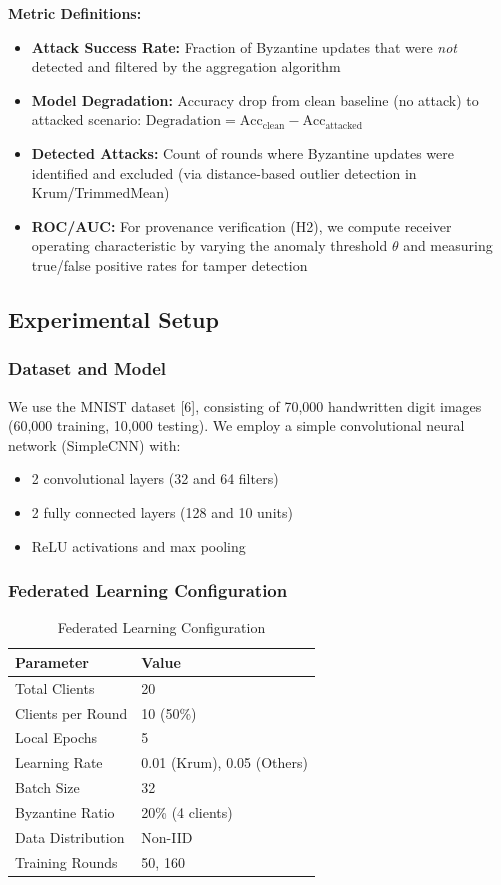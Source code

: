 \documentclass[12pt,a4paper,onecolumn]{article}
\begin{document}
\textbf{Metric Definitions:}
\begin{itemize}
    \item \textbf{Attack Success Rate:} Fraction of Byzantine updates that were \emph{not} detected and filtered by the aggregation algorithm
    \item \textbf{Model Degradation:} Accuracy drop from clean baseline (no attack) to attacked scenario: $\text{Degradation} = \text{Acc}_{\text{clean}} - \text{Acc}_{\text{attacked}}$
    \item \textbf{Detected Attacks:} Count of rounds where Byzantine updates were identified and excluded (via distance-based outlier detection in Krum/TrimmedMean)
    \item \textbf{ROC/AUC:} For provenance verification (H2), we compute receiver operating characteristic by varying the anomaly threshold $\theta$ and measuring true/false positive rates for tamper detection
\end{itemize}

\subsection{Experimental Setup}

\subsubsection{Dataset and Model}

We use the MNIST dataset [6], consisting of 70,000 handwritten digit images (60,000 training, 10,000 testing). We employ a simple convolutional neural network (SimpleCNN) with:
\begin{itemize}
    \item 2 convolutional layers (32 and 64 filters)
    \item 2 fully connected layers (128 and 10 units)
    \item ReLU activations and max pooling
\end{itemize}

\subsubsection{Federated Learning Configuration}

\begin{table}[t]
\caption{Federated Learning Configuration}
\label{tab:fl_config}
\centering
\begin{tabular}{ll}
\toprule
\textbf{Parameter} & \textbf{Value} \\
\midrule
Total Clients & 20 \\
Clients per Round & 10 (50\%) \\
Local Epochs & 5 \\
Learning Rate & 0.01 (Krum), 0.05 (Others) \\
Batch Size & 32 \\
Byzantine Ratio & 20\% (4 clients) \\
Data Distribution & Non-IID \\
Training Rounds & 50, 160 \\
\bottomrule
\end{tabular}
\end{table}
\end{document}
